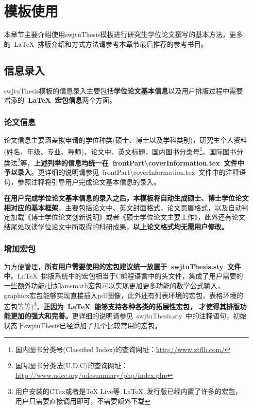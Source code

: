 \chapter{模板使用}\label{第2章}

本章节主要介绍使用swjtuThesis模板进行研究生学位论文撰写的基本方法，更多的~\LaTeX{}~排版介绍和方式方法请参考本章节最后推荐的参考书目。

\section{信息录入}
swjtuThesis模板的信息录入主要包括\textbf{学位论文基本信息}以及用户排版过程中需要增添的\textbf{~\LaTeX{}~宏包信息}两个方面。

\subsection{论文信息}
论文信息主要涵盖拟申请的学位种类(硕士、博士以及学科类别)，研究生个人资料(姓名、年级、专业、导师)，论文中、英文标题，国内图书分类号\footnote{国内图书分类号(Classified Index)的查询网址：\url{http://www.ztflh.com/}}、国际图书分类法\footnote{国际图书分类法(U.D.C)的查询网址：\url{http://www.udcc.org/udcsummary/php/index.php}}等，\textbf{上述列举的信息均统一在~frontPart\textbackslash{}coverInformation.tex~文件中予以录入}。更详细的说明请参见~frontPart\textbackslash{}coverInformation.tex~文件中的注释语句，参照注释将引导用户完成论文基本信息的录入。

\textbf{在用户完成学位论文基本信息的录入之后，本模板将自动生成硕士、博士学位论文相对应的基本框架}，主要包括论文中、英文封面格式，论文页眉格式，以及自动判定加载《博士学位论文创新说明》或者《硕士学位论文主要工作》，此外还有论文结尾处攻读学位论文中所取得的科研成果，\textbf{以上论文格式均无需用户修改。}

\subsection{增加宏包}
为方便管理，\textbf{所有用户需要使用的宏包建议统一放置于~swjtuThesis.sty~文件中}。\LaTeX{}~排版系统中的宏包相当于C编程语言中的头文件，集成了用户需要的一些额外功能(比如amsmath宏包可以实现更加更多功能的数学公式输入，graphicx宏包能够实现直接插入pdf图像，此外还有列表环境的宏包，表格环境的宏包等等)\footnote{用户安装的CTex或者是TeX Live等~\LaTeX{}~发行版已经内置了许多的宏包，用户只需要直接调用即可，不需要额外下载}。\textbf{正因为~\LaTeX{}~能够支持各种各类的拓展性宏包， 才使得其排版功能更加的强大和完善。}更详细的说明请参见~swjtuThesis.sty~中的注释语句，初始状态下swjtuThesis已经添加了几个比较常用的宏包。



